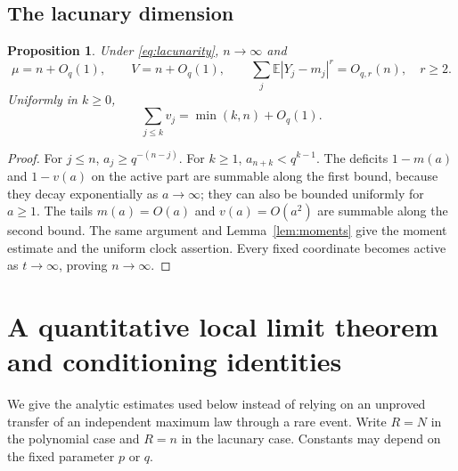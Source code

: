 \documentclass[11pt,a4paper]{article}
\numberwithin{equation}{section}
\newtheorem{proposition}[theorem]{Proposition}
\theoremstyle{definition}
\theoremstyle{remark}
\newcommand{\E}{\mathbb E}
\begin{document}
\subsection{The lacunary dimension}
\begin{proposition}
\label{prop:lacdimension}
Under \eqref{eq:lacunarity}, $n\to\infty$ and
\begin{equation}
 \mu=n+O_q(1),\qquad V=n+O_q(1),\qquad
 \sum_j\E|Y_j-m_j|^r=O_{q,r}(n),\quad r\ge2.
 \label{eq:lacdimension}
\end{equation}
Uniformly in $k\ge0$,
\begin{equation}
 \sum_{j\le k}v_j=\min(k,n)+O_q(1).
 \label{eq:lacclock}
\end{equation}
\end{proposition}
\begin{proof}
For $j\le n$, $a_j\ge q^{-(n-j)}$. For $k\ge1$,
$a_{n+k}<q^{k-1}$. The deficits $1-m(a)$ and $1-v(a)$ on the active
part are summable along the first bound, because they decay exponentially
as $a\to\infty$; they can also be bounded uniformly for $a\ge1$.
The tails $m(a)=O(a)$ and $v(a)=O(a^2)$ are summable along the second
bound. The same argument and Lemma~\ref{lem:moments} give the moment
estimate and the uniform clock assertion. Every fixed coordinate
becomes active as $t\to\infty$, proving $n\to\infty$.
\end{proof}

\section{A quantitative local limit theorem and conditioning identities}
\label{sec:local}

We give the analytic estimates used below instead of relying on an
unproved transfer of an independent maximum law through a rare event.
Write $R=N$ in the polynomial case and $R=n$ in the lacunary case.
Constants may depend on the fixed parameter $p$ or $q$.
\end{document}
